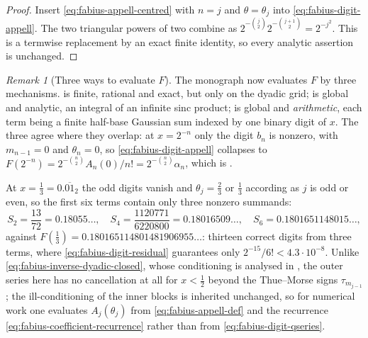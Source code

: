 \documentclass[11pt,a4paper,oneside,openany]{book}
\theoremstyle{definition}
\theoremstyle{remark}
\newtheorem{remark}[remark]{Remark}
\begin{document}
\begin{proof}
Insert \eqref{eq:fabius-appell-centred} with $n=j$ and $\theta=\theta_j$ into
\eqref{eq:fabius-digit-appell}.  The two triangular powers of two combine as
$2^{-\binom j2}2^{-\binom{j+1}{2}}=2^{-j^2}$.  This is a termwise replacement by
an exact finite identity, so every analytic assertion is unchanged.
\end{proof}

\begin{remark}[Three ways to evaluate $F$]\label{rem:fabius-digit-vs-fourier}
The monograph now evaluates $F$ by three mechanisms.
 is finite, rational and exact, but only on the
dyadic grid;  is global and analytic, an
integral of an infinite sinc product;
 is global and \emph{arithmetic}, each term being
a finite half-base Gaussian sum indexed by one binary digit of $x$.  The three
agree where they overlap: at $x=2^{-n}$ only the digit $b_n$ is nonzero, with
$m_{n-1}=0$ and $\theta_n=0$, so \eqref{eq:fabius-digit-appell} collapses to
$F(2^{-n})=2^{-\binom n2}A_n(0)/n!=2^{-\binom n2}\alpha_n$, which is
.

At $x=\tfrac13=0.\overline{01}_2$ the odd digits vanish and
$\theta_j=\tfrac23$ or $\tfrac13$ according as $j$ is odd or even, so the first
six terms contain only three nonzero summands:
\[
 S_2=\frac{13}{72}=0.18055\ldots,\quad
 S_4=\frac{1120771}{6220800}=0.18016509\ldots,\quad
 S_6=0.1801651148015\ldots,
\]
against $F(\tfrac13)=0.180165114801481906955\ldots$: thirteen correct digits
from three terms, where \eqref{eq:fabius-digit-residual} guarantees only
$2^{-15}/6!<4.3\cdot10^{-8}$.  Unlike
\eqref{eq:fabius-inverse-dyadic-closed}, whose conditioning is analysed in
, the outer series here has no cancellation at
all for $x<\tfrac12$ beyond the Thue--Morse signs $\tau_{m_{j-1}}$; the
ill-conditioning of the inner blocks is inherited unchanged, so for numerical
work one evaluates $A_j(\theta_j)$ from
\eqref{eq:fabius-appell-def} and the recurrence
\eqref{eq:fabius-coefficient-recurrence} rather than from
\eqref{eq:fabius-digit-qseries}.
\end{remark}
\end{document}
